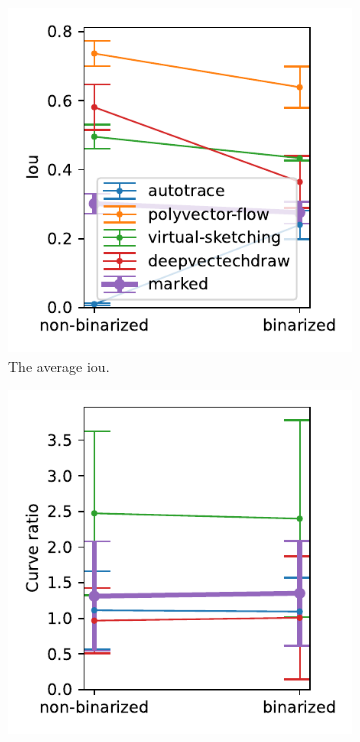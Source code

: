 \begin{figure}[h]
    \centering
    \begin{subfigure}{.3\textwidth}
    \centering
    \includegraphics[width=\textwidth]{graphics/eval/iou_True_1024-1.024_sketchbench.pdf}
    \caption{The average \gls{iou}.}
\end{subfigure}
    \begin{subfigure}{.3\textwidth}
    \centering
    \includegraphics[width=\textwidth]{graphics/eval/curve ratio_True_1024-1.024_sketchbench.pdf}

\end{subfigure}
\end{figure}
